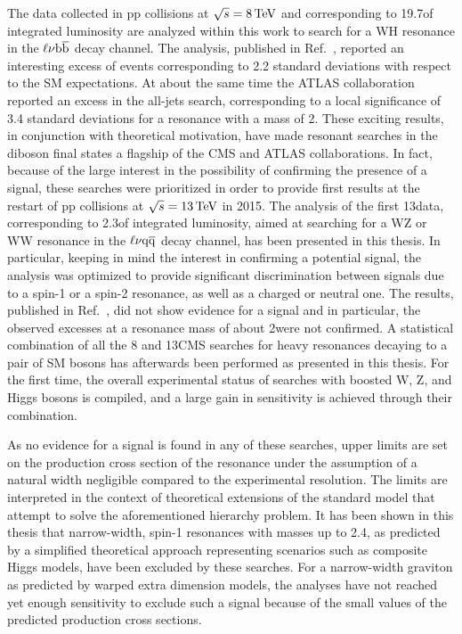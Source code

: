 The data collected in pp collisions at $\sqrt{s} = 8\,\text{Te\hspace{-.08em}V}$ and corresponding to 19.7\fbinv of integrated luminosity are analyzed within this work to search for a WH resonance in the $\ell\nu{\mathrm{b}\overline{\mathrm{b}}}$ decay channel. The analysis, published in Ref.~\cite{Khachatryan:2016yji}, reported an interesting excess of events corresponding to 2.2 standard deviations with respect to the SM expectations. At about the same time the ATLAS collaboration reported an excess in the all-jets search, corresponding to a local significance of 3.4 standard deviations for a resonance with a mass of 2\TeV. These exciting results, in conjunction with theoretical motivation, have made resonant searches in the diboson final states a flagship of the CMS and ATLAS collaborations. In fact, because of the large interest in the possibility of confirming the presence of a signal, these searches were prioritized in order to provide first results at the restart of pp collisions at $\sqrt{s} = 13\,\text{Te\hspace{-.08em}V}$ in 2015. The analysis of the first 13\TeV data, corresponding to 2.3\fbinv of integrated luminosity, aimed at searching for a WZ or WW resonance in the $\ell\nu\mathrm{q}\overline{\mathrm{q}}$ decay channel, has been presented in this thesis. In particular, keeping in mind the interest in confirming a potential signal, the analysis was optimized to provide significant discrimination between signals due to a spin-1 or a spin-2 resonance, as well as a charged or neutral one.
The results, published in Ref.~\cite{CMS-PAS-EXO-15-002}, did not show evidence for a signal and in particular, the observed excesses at a resonance mass of about 2\TeV were not confirmed.
A statistical combination of all the 8 and 13\TeV CMS searches for heavy resonances decaying to a pair of SM bosons has afterwards been performed as presented in this thesis.
For the first time, the overall experimental status of searches with boosted W, Z, and Higgs bosons is compiled, and a large gain in sensitivity is achieved through their combination.

As no evidence for a signal is found in any of these searches, upper limits are set on the production cross section of the resonance under the assumption of a natural width negligible compared to the experimental resolution.
The limits are interpreted in the context of theoretical extensions of the standard model that attempt to solve the aforementioned hierarchy problem.
It has been shown in this thesis that narrow-width, spin-1 resonances with masses up to 2.4\TeV, as predicted by a simplified theoretical approach representing scenarios such as composite Higgs models, have been excluded by these searches. For a narrow-width graviton as predicted by warped extra dimension models, the analyses have not reached yet enough sensitivity to exclude such a signal because of the small values of the predicted production cross sections.


